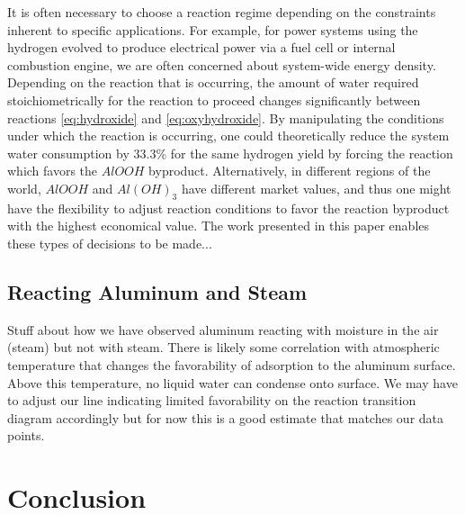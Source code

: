 \documentclass[preprint,12pt,3p]{elsarticle}
\begin{document}
It is often necessary to choose a reaction regime depending on the constraints
inherent to specific applications. For example, for power systems using the
hydrogen evolved to produce electrical power via a fuel cell or internal
combustion engine, we are often concerned about system-wide energy density.
Depending on the reaction that is occurring, the amount of water required
stoichiometrically for the reaction to proceed changes significantly between
reactions \ref{eq:hydroxide} and \ref{eq:oxyhydroxide}. By manipulating the
conditions under which the reaction is occurring, one could theoretically reduce
the system water consumption by 33.3\% for the same hydrogen yield by forcing
the reaction which favors the $AlOOH$ byproduct. Alternatively, in different
regions of the world, $AlOOH$ and $Al(OH)_3$ have different market values, and
thus one might have the flexibility to adjust reaction conditions to favor the
reaction byproduct with the highest economical value. The work presented in this
paper enables these types of decisions to be made...

\subsection{Reacting Aluminum and Steam} Stuff about how we have observed
aluminum reacting with moisture in the air (steam) but not with steam. There is
likely some correlation with atmospheric temperature that changes the
favorability of adsorption to the aluminum surface. Above this temperature, no
liquid water can condense onto surface. We may have to adjust our line
indicating limited favorability on the reaction transition diagram accordingly
but for now this is a good estimate that matches our data points.

\section{Conclusion}
\label{conclusion}





\begin{thebibliography}{00}


\bibitem{}

\end{thebibliography}
\end{document}
